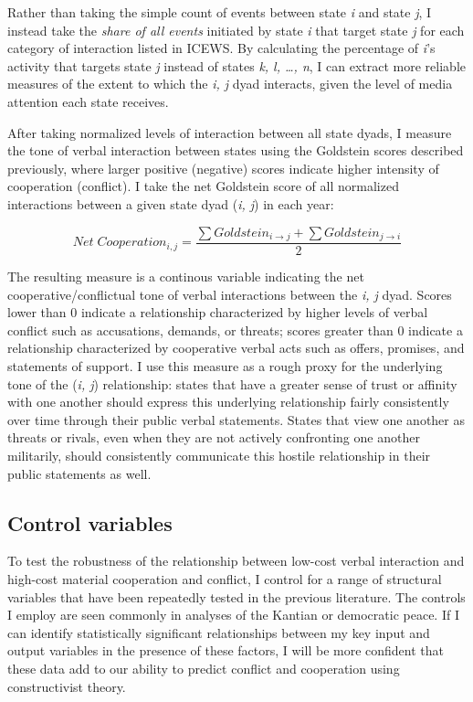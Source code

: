 \documentclass[10pt,]{article}
\begin{document}
Rather than taking the simple count of events between state \emph{i} and
state \emph{j}, I instead take the \emph{share of all events} initiated
by state \emph{i} that target state \emph{j} for each category of
interaction listed in ICEWS. By calculating the percentage of \emph{i}'s
activity that targets state \emph{j} instead of states \emph{k, l,
\ldots{}, n}, I can extract more reliable measures of the extent to
which the \emph{i, j} dyad interacts, given the level of media attention
each state receives.

After taking normalized levels of interaction between all state dyads, I
measure the tone of verbal interaction between states using the
Goldstein scores described previously, where larger positive (negative)
scores indicate higher intensity of cooperation (conflict). I take the
net Goldstein score of all normalized interactions between a given state
dyad (\emph{i, j}) in each year:

\[
Net\;Cooperation_{i,j} = \frac{\sum Goldstein_{i \rightarrow j} + \sum Goldstein_{j \rightarrow i}}{2}
\]

The resulting measure is a continous variable indicating the net
cooperative/conflictual tone of verbal interactions between the \emph{i,
j} dyad. Scores lower than 0 indicate a relationship characterized by
higher levels of verbal conflict such as accusations, demands, or
threats; scores greater than 0 indicate a relationship characterized by
cooperative verbal acts such as offers, promises, and statements of
support. I use this measure as a rough proxy for the underlying tone of
the (\emph{i, j}) relationship: states that have a greater sense of
trust or affinity with one another should express this underlying
relationship fairly consistently over time through their public verbal
statements. States that view one another as threats or rivals, even when
they are not actively confronting one another militarily, should
consistently communicate this hostile relationship in their public
statements as well.

\subsection{Control variables}\label{control-variables}

To test the robustness of the relationship between low-cost verbal
interaction and high-cost material cooperation and conflict, I control
for a range of structural variables that have been repeatedly tested in
the previous literature. The controls I employ are seen commonly in
analyses of the Kantian or democratic peace. If I can identify
statistically significant relationships between my key input and output
variables in the presence of these factors, I will be more confident
that these data add to our ability to predict conflict and cooperation
using constructivist theory.
\end{document}
